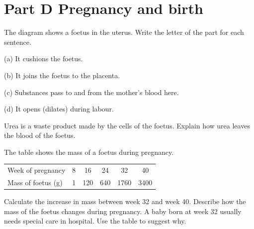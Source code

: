 \documentclass[11pt]{article}
\begin{document}
\section{Part D \textperiodcentered{} Pregnancy and birth}
\Q The diagram shows a foetus in the uterus. Write the letter of the part for each sentence.
\par\vspace{1mm}
\begin{minipage}[t]{0.50\linewidth}\vspace{0pt}\FigWomb[3.9mm]\end{minipage}\hfill
\begin{minipage}[t]{0.46\linewidth}\vspace{5mm}\raggedright
(a) It cushions the foetus. \hfill{}\par\vspace{3.5mm}
(b) It joins the foetus to the placenta. \hfill{}\par\vspace{3.5mm}
(c) Substances pass to and from the mother's blood here. \hfill{}\par\vspace{3.5mm}
(d) It opens (dilates) during labour. \hfill{}
\end{minipage}\par\vspace{2mm}

\Q Urea is a waste product made by the cells of the foetus. Explain how urea leaves the blood of the foetus.

\Q The table shows the mass of a foetus during pregnancy.
\par\vspace{1mm}
\begin{tabular}{@{}l *{5}{c}@{}}
\toprule
Week of pregnancy & 8 & 16 & 24 & 32 & 40\\
Mass of foetus (g) & 1 & 120 & 640 & 1760 & 3400\\
\bottomrule
\end{tabular}\par\vspace{1mm}
 Calculate the increase in mass between week 32 and week 40.
 Describe how the mass of the foetus changes during pregnancy.
 A baby born at week 32 usually needs special care in hospital. Use the table to suggest why.
\end{document}
